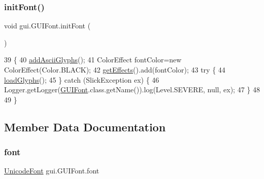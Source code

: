\subsubsection{\texorpdfstring{init\+Font()}{initFont()}\hspace{0.1cm}{\footnotesize\ttfamily [2/2]}}
{\footnotesize\ttfamily void gui.\+G\+U\+I\+Font.\+init\+Font (\begin{DoxyParamCaption}{ }\end{DoxyParamCaption})\hspace{0.3cm}{\ttfamily [inline]}}


\begin{DoxyCode}
39                           \{
40         \mbox{\hyperlink{classorg_1_1newdawn_1_1slick_1_1_unicode_font_aff50fdcbd957c6141d24dd877105110c}{addAsciiGlyphs}}();
41         ColorEffect fontColor=\textcolor{keyword}{new} ColorEffect(Color.BLACK);
42         \mbox{\hyperlink{classorg_1_1newdawn_1_1slick_1_1_unicode_font_a939775feafa7099e8631da5ef44ee28c}{getEffects}}().add(fontColor);
43         \textcolor{keywordflow}{try} \{
44             \mbox{\hyperlink{classorg_1_1newdawn_1_1slick_1_1_unicode_font_abf14d8ad33f80b66e14990417bd04088}{loadGlyphs}}();
45         \} \textcolor{keywordflow}{catch} (SlickException ex) \{
46             Logger.getLogger(\mbox{\hyperlink{classgui_1_1_g_u_i_font_a5d39053888fa6b4733bc8b8c79a569c9}{GUIFont}}.class.getName()).log(Level.SEVERE, null, ex);
47         \}
48         
49     \}
\end{DoxyCode}


\subsection{Member Data Documentation}
\mbox{\label{classgui_1_1_g_u_i_font_a42eef190580119d94deeee2a9fa2a927}} 
\subsubsection{\texorpdfstring{font}{font}}
{\footnotesize\ttfamily \mbox{\hyperlink{classorg_1_1newdawn_1_1slick_1_1_unicode_font}{Unicode\+Font}} gui.\+G\+U\+I\+Font.\+font\hspace{0.3cm}{\ttfamily [private]}}

